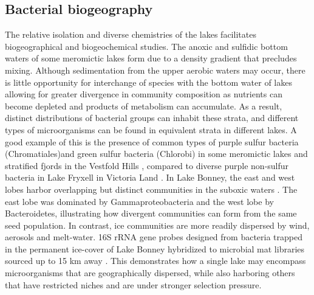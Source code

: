 \subsection{Bacterial biogeography}
The relative isolation and diverse chemistries of the lakes facilitates biogeographical and biogeochemical studies. 
The anoxic and sulfidic bottom waters of some meromictic lakes form due to a density gradient that precludes mixing. 
Although sedimentation from the upper aerobic waters may occur, 
there is little opportunity for interchange of species with the bottom water of lakes allowing for greater divergence in community composition as nutrients can become depleted 
and products of metabolism can accumulate.
As a result, distinct distributions of bacterial groups can inhabit these strata, and different types of microorganisms can be found in equivalent strata in different lakes. 
A good example of this is the presence of common types of purple sulfur bacteria (Chromatiales)and green sulfur bacteria (Chlorobi) 
in some meromictic lakes and stratified fjords in the Vestfold Hills \cite{Burke1988},
compared to diverse purple non-sulfur bacteria in Lake Fryxell in Victoria Land \cite{Karr2003}. 
In Lake Bonney, the east and west lobes harbor overlapping but distinct communities in the suboxic waters \cite{Glatz2006}.
The east lobe was dominated by Gammaproteobacteria and the west lobe by Bacteroidetes, illustrating how divergent communities can form from the same seed population. 
In contrast, ice communities are more readily dispersed by wind, aerosols and melt-water. 
16S rRNA gene probes designed from bacteria trapped in the permanent ice-cover of Lake Bonney hybridized to microbial mat libraries sourced up to 15 km away \cite{Gordon2000}.
This demonstrates how a single lake may encompass microorganisms that are geographically dispersed, while also harboring others that have restricted niches and are under stronger selection pressure.


